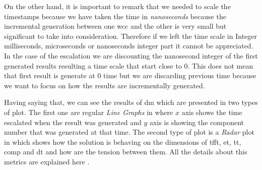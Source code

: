 \documentclass[preprint]{elsarticle}
\begin{document}
On the other hand, it is important to remark that we needed to scale the timestamps because we have taken the time in \emph{nanoseconds} because the incremental generation between one \acrshort{wcc} and the other is very small but significant to take into consideration. Therefore if we left the time scale in Integer milliseconds, microseconds or nanoseconds integer part it cannot be appreciated. In the case of the escalation we are discounting the nanosecond integer of the first generated results resulting a time scale that start close to $0$. This does not mean that first result is generate at $0$ time but we are discarding previous time because we want to focus on how the results are incrementally generated.

Having saying that, we can see the results of \acrshort{dm} which are presented in two types of plot. The first one are regular \emph{Line Graphs} in where $x$ axis shows the time escalated when the result was generated and $y$ axis is showing the component number that was generated at that time. The second type of plot is a \emph{Radar} plot in which shows how the solution is behaving on the dimensions of  \acrfull{tfft}, \acrfull{et}, \acrfull{tt}, \acrfull{comp} and \acrfull{dt} and how are the tension between them. All the details about this metrics are explained here \cite{diefpaper}.
\end{document}
